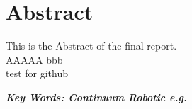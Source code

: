\section*{Abstract} 
This is the Abstract of the final report. \\
AAAAA
bbb \\
test for github

\vfill


\textbf{\emph{Key Words: Continuum Robotic e.g.}}
\vspace{0.8cm}
\setcounter{page}{1}
\newpage